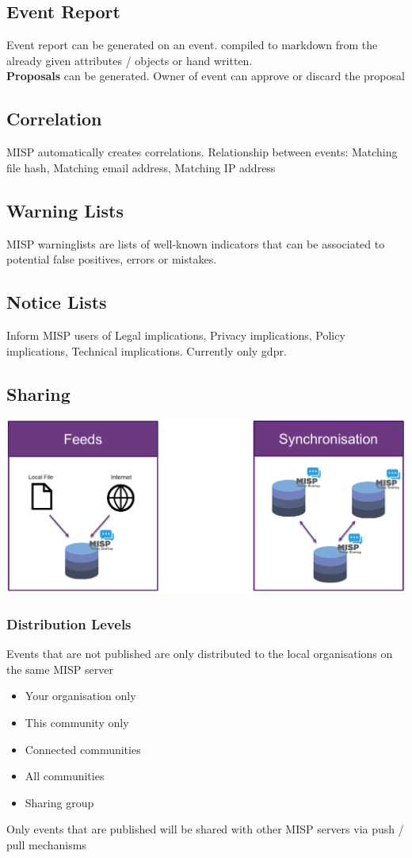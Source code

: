 \subsection{Event Report}
Event report can be generated on an event. compiled to markdown from the already given attributes / objects or hand written.\\
\textbf{Proposals} can be generated. Owner of event can approve or discard the proposal
\subsection{Correlation}
MISP automatically creates correlations. Relationship between events: Matching file hash, Matching email address, Matching IP address
\subsection{Warning Lists}
MISP warninglists are lists of well-known indicators that can be associated to potential false positives, errors or mistakes.
\subsection{Notice Lists}
Inform MISP users of Legal implications, Privacy implications, Policy implications, Technical implications.
Currently only gdpr.
\subsection{Sharing}
\includegraphics[width=\linewidth]{./img/15-misp/sharing.png}
\subsubsection{Distribution Levels}
Events that are not published are only distributed to the local organisations on the same MISP server
\begin{itemize}
    \item Your organisation only
    \item This community only
    \item Connected communities
    \item All communities
    \item Sharing group
\end{itemize}
Only events that are published will be shared with other MISP servers via push / pull mechanisms
